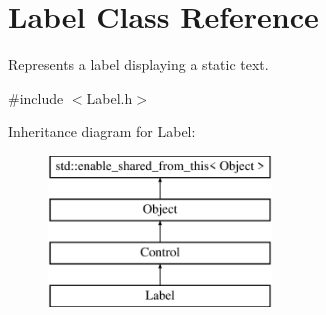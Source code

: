 \hypertarget{class_label}{}\section{Label Class Reference}
\label{class_label}


Represents a label displaying a static text.  




{\ttfamily \#include $<$Label.\+h$>$}

Inheritance diagram for Label\+:\begin{figure}[H]
\begin{center}
\leavevmode
\includegraphics[height=4.000000cm]{class_label}
\end{center}
\end{figure}
